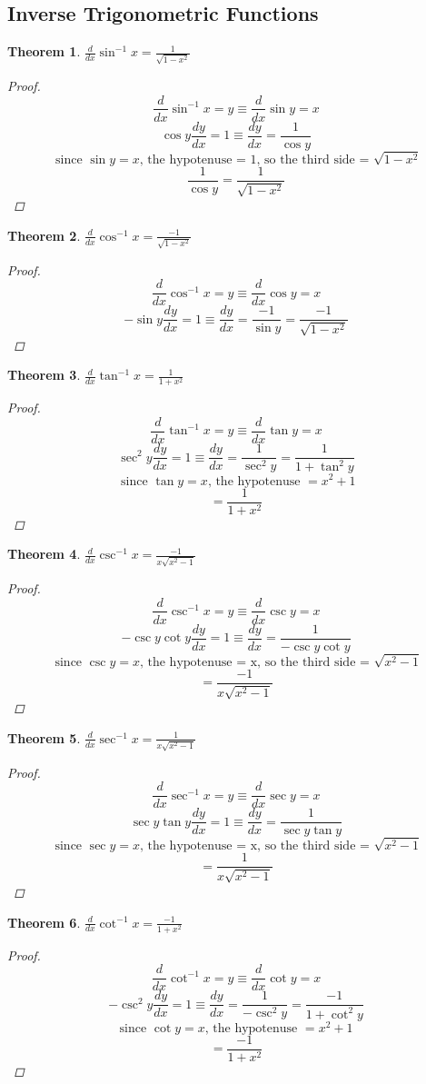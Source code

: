 \documentclass[10pt]{report}
\newtheorem{thm3}{Theorem}[subsection]
\begin{document}
\subsection{Inverse Trigonometric Functions}
\begin{thm3}
$\frac{d}{dx}\sin ^{-1}x=\frac{1}{\sqrt{1-x^2}}$
\begin{proof}
$$\frac{d}{dx}\sin ^{-1}x=y\equiv \frac{d}{dx}\sin y=x$$
$$\cos y\frac{dy}{dx}=1\equiv \frac{dy}{dx}=\frac{1}{\cos y}$$
$$\text{ since $\sin y=x$, the hypotenuse = 1, so the third side = $\sqrt{1-x^2}$}$$
$$\frac{1}{\cos y}= \frac{1}{\sqrt{1-x^2}}$$
\end{proof}
\end{thm3}
\begin{thm3}
$\frac{d}{dx}\cos ^{-1}x=\frac{-1}{\sqrt{1-x^2}}$
\begin{proof}
$$\frac{d}{dx}\cos ^{-1}x=y\equiv \frac{d}{dx}\cos y=x$$
$$-\sin y\frac{dy}{dx}=1\equiv \frac{dy}{dx}=\frac{-1}{\sin y}= \frac{-1}{\sqrt{1-x^2}}$$
\end{proof}
\end{thm3}
\begin{thm3}
$\frac{d}{dx}\tan ^{-1}x=\frac{1}{1+x^2}$
\begin{proof}
$$\frac{d}{dx}\tan ^{-1}x=y\equiv \frac{d}{dx}\tan y=x$$
$$\sec^2 y\frac{dy}{dx}=1\equiv \frac{dy}{dx}=\frac{1}{\sec^2 y}= \frac{1}{1+\tan^2 y}$$
$$\text{ since $\tan y=x$, the hypotenuse $=x^2+1$}$$
$$= \frac{1}{1+x^2}$$
\end{proof}
\end{thm3}
\begin{thm3}
$\frac{d}{dx}\csc ^{-1}x=\frac{-1}{x\sqrt{x^2 -1}}$
\begin{proof}
$$\frac{d}{dx}\csc ^{-1}x=y\equiv \frac{d}{dx}\csc y=x$$
$$-\csc y\cot y\frac{dy}{dx}=1\equiv \frac{dy}{dx}=\frac{1}{-\csc y\cot y}$$
$$\text{ since $\csc y=x$, the hypotenuse = x, so the third side = $\sqrt{x^2-1}$}$$
$$= \frac{-1}{x\sqrt{x^2-1}}$$
\end{proof}
\end{thm3}
\begin{thm3}
$\frac{d}{dx}\sec ^{-1}x=\frac{1}{x\sqrt{x^2 -1}}$
\begin{proof}
$$\frac{d}{dx}\sec ^{-1}x=y\equiv \frac{d}{dx}\sec y=x$$
$$\sec y\tan y\frac{dy}{dx}=1\equiv \frac{dy}{dx}=\frac{1}{\sec y\tan y}$$
$$\text{ since $\sec y=x$, the hypotenuse = x, so the third side = $\sqrt{x^2-1}$}$$
$$= \frac{1}{x\sqrt{x^2-1}}$$
\end{proof}
\end{thm3}
\begin{thm3}
$\frac{d}{dx}\cot ^{-1}x=\frac{-1}{1+x^2}$
\begin{proof}
$$\frac{d}{dx}\cot ^{-1}x=y\equiv \frac{d}{dx}\cot y=x$$
$$-\csc^2 y\frac{dy}{dx}=1\equiv \frac{dy}{dx}=\frac{1}{-\csc^2 y}= \frac{-1}{1+\cot^2 y}$$
$$\text{since $\cot y=x$, the hypotenuse $=x^2+1$}$$
$$= \frac{-1}{1+x^2}$$
\end{proof}
\end{thm3}
\end{document}
